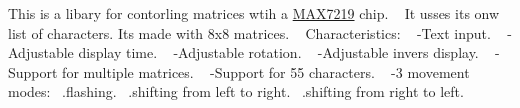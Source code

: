 This is a libary for contorling matrices wtih a \hyperlink{class_m_a_x7219}{M\+A\+X7219} chip. ~\newline
It usses its onw list of characters. Its made with 8x8 matrices. ~\newline
Characteristics\+: ~\newline
-\/\+Text input. ~\newline
 -\/\+Adjustable display time. ~\newline
-\/\+Adjustable rotation. ~\newline
-\/\+Adjustable invers display. ~\newline
-\/\+Support for multiple matrices. ~\newline
-\/\+Support for 55 characters. ~\newline
-\/3 movement modes\+: ~.\+flashing. ~.\+shifting from left to right. ~.\+shifting from right to left. ~\newline
